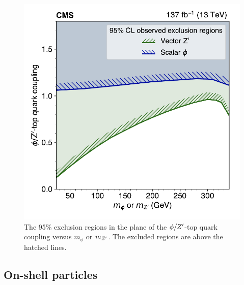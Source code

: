 \begin{figure}[!hbtp]
\centering
    \includegraphics[width=.70\textwidth]{figs/ftp/plot_2d_phizprime.pdf}
\caption{
    The 95\% \CL exclusion regions in the plane of the $\phi/Z^\prime$-top quark coupling versus
    $m_{\phi}$ or $m_{Z^\prime}$. The excluded regions are above the hatched lines.
    }
\label{fig:ZprimePhiExclusions}
\end{figure}


\FloatBarrier

\subsection{On-shell particles}

